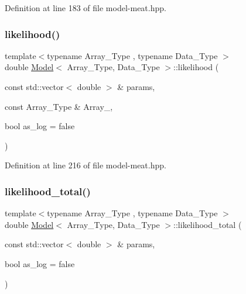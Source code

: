 Definition at line 183 of file model-\/meat.\+hpp.

\mbox{\label{class_model_adf2c30d9c5ffdc87af6813d110146968}} 
\subsubsection{\texorpdfstring{likelihood()}{likelihood()}\hspace{0.1cm}{\footnotesize\ttfamily [2/2]}}
{\footnotesize\ttfamily template$<$typename Array\+\_\+\+Type , typename Data\+\_\+\+Type $>$ \\
double \hyperlink{class_model}{Model}$<$ Array\+\_\+\+Type, Data\+\_\+\+Type $>$\+::likelihood (\begin{DoxyParamCaption}\item[{const std\+::vector$<$ double $>$ \&}]{params,  }\item[{const Array\+\_\+\+Type \&}]{Array\+\_\+,  }\item[{bool}]{as\+\_\+log = {\ttfamily false} }\end{DoxyParamCaption})\hspace{0.3cm}{\ttfamily [inline]}}



Definition at line 216 of file model-\/meat.\+hpp.

\mbox{\label{class_model_a2fe9cf412c5b2323c35c18952f9cb09d}} 
\subsubsection{\texorpdfstring{likelihood\+\_\+total()}{likelihood\_total()}}
{\footnotesize\ttfamily template$<$typename Array\+\_\+\+Type , typename Data\+\_\+\+Type $>$ \\
double \hyperlink{class_model}{Model}$<$ Array\+\_\+\+Type, Data\+\_\+\+Type $>$\+::likelihood\+\_\+total (\begin{DoxyParamCaption}\item[{const std\+::vector$<$ double $>$ \&}]{params,  }\item[{bool}]{as\+\_\+log = {\ttfamily false} }\end{DoxyParamCaption})\hspace{0.3cm}{\ttfamily [inline]}}



